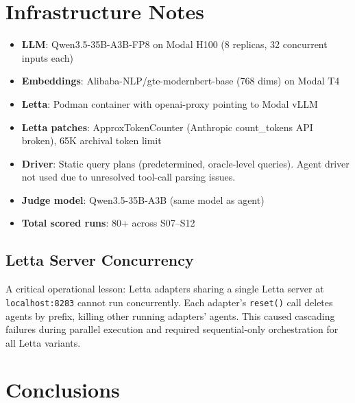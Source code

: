 \documentclass[11pt,letterpaper]{article}
\begin{document}
\section{Infrastructure Notes}
\label{sec:infra}

\begin{itemize}[nosep]
  \item \textbf{LLM}: Qwen3.5-35B-A3B-FP8 on Modal H100 (8 replicas, 32 concurrent inputs each)
  \item \textbf{Embeddings}: Alibaba-NLP/gte-modernbert-base (768 dims) on Modal T4
  \item \textbf{Letta}: Podman container with openai-proxy pointing to Modal vLLM
  \item \textbf{Letta patches}: ApproxTokenCounter (Anthropic count\_tokens API broken), 65K archival token limit
  \item \textbf{Driver}: Static query plans (predetermined, oracle-level queries). Agent driver not used due to unresolved tool-call parsing issues.
  \item \textbf{Judge model}: Qwen3.5-35B-A3B (same model as agent)
  \item \textbf{Total scored runs}: 80+ across S07--S12
\end{itemize}

\subsection{Letta Server Concurrency}

A critical operational lesson: Letta adapters sharing a single Letta server at \texttt{localhost:8283} cannot run concurrently. Each adapter's \texttt{reset()} call deletes agents by prefix, killing other running adapters' agents. This caused cascading failures during parallel execution and required sequential-only orchestration for all Letta variants.

\section{Conclusions}
\label{sec:conclusions}
\end{document}
